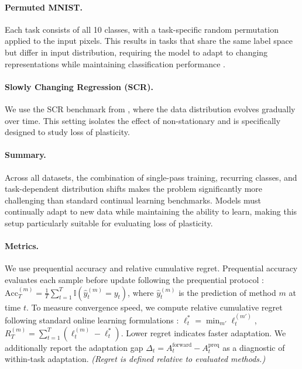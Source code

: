 \documentclass{article}
\begin{document}
\paragraph{Permuted MNIST.}
Each task consists of all 10 classes, with a task-specific random permutation applied to the input pixels. This results in tasks that share the same label space but differ in input distribution, requiring the model to adapt to changing representations while maintaining classification performance \citep{goodfellow2013empirical}.


\normalfont
\raggedright
\paragraph{Slowly Changing Regression (SCR).}
We use the SCR benchmark from \citet{dohare2024continual}, where the data distribution evolves gradually over time. This setting isolates the effect of non-stationary and is specifically designed to study loss of plasticity.

\paragraph{Summary.}
Across all datasets, the combination of single-pass training, recurring classes, and task-dependent distribution shifts makes the problem significantly more challenging than standard continual learning benchmarks. Models must continually adapt to new data while maintaining the ability to learn, making this setup particularly suitable for evaluating loss of plasticity.



\paragraph{Metrics.}
We use prequential accuracy and relative cumulative regret. Prequential accuracy evaluates each sample before update following the prequential protocol \citep{dawid1984present}:
$\text{Acc}_T^{(m)} = \frac{1}{T}\sum_{t=1}^{T}\mathbb{I}(\hat{y}_t^{(m)} = y_t)$,
where $\hat{y}_t^{(m)}$ is the prediction of method $m$ at time $t$. 
To measure convergence speed, we compute relative cumulative regret following standard online learning formulations \citep{cesa2006prediction}:
$\ell_t^* = \min_{m'} \ell_t^{(m')}$,
$R_T^{(m)} = \sum_{t=1}^{T} (\ell_t^{(m)} - \ell_t^*)$.
Lower regret indicates faster adaptation. 
We additionally report the adaptation gap $\Delta_t = A_t^{\mathrm{forward}} - A_t^{\mathrm{preq}}$ as a diagnostic of within-task adaptation. 
\textit{(Regret is defined relative to evaluated methods.)}
\end{document}
